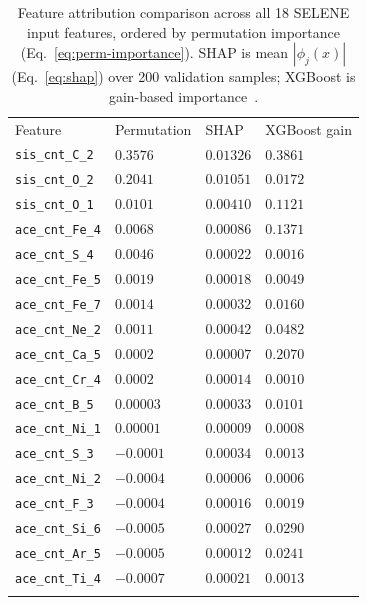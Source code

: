\documentclass[graybox]{SNmult}
\begin{document}
\begin{table}[t]
  \footnotesize
  \caption{Feature attribution comparison across all 18 SELENE input features,
  ordered by permutation importance (Eq.~\ref{eq:perm-importance}). SHAP is
  mean $|\phi_j(x)|$ (Eq.~\ref{eq:shap}) over 200 validation samples; XGBoost
  is gain-based importance~\cite{chen2016xgboost}.}
  \label{tab:attribution}
  \begin{tabular}{p{2.6cm}p{1.8cm}p{1.6cm}p{2cm}}
    \hline\noalign{\smallskip}
    Feature & Permutation & SHAP & XGBoost gain \\
    \noalign{\smallskip}\svhline\noalign{\smallskip}
    \texttt{sis\_cnt\_C\_2}  & $0.3576$  & $0.01326$ & $0.3861$ \\
    \texttt{sis\_cnt\_O\_2}  & $0.2041$  & $0.01051$ & $0.0172$ \\
    \texttt{sis\_cnt\_O\_1}  & $0.0101$  & $0.00410$ & $0.1121$ \\
    \texttt{ace\_cnt\_Fe\_4} & $0.0068$  & $0.00086$ & $0.1371$ \\
    \texttt{ace\_cnt\_S\_4}  & $0.0046$  & $0.00022$ & $0.0016$ \\
    \texttt{ace\_cnt\_Fe\_5} & $0.0019$  & $0.00018$ & $0.0049$ \\
    \texttt{ace\_cnt\_Fe\_7} & $0.0014$  & $0.00032$ & $0.0160$ \\
    \texttt{ace\_cnt\_Ne\_2} & $0.0011$  & $0.00042$ & $0.0482$ \\
    \texttt{ace\_cnt\_Ca\_5} & $0.0002$  & $0.00007$ & $0.2070$ \\
    \texttt{ace\_cnt\_Cr\_4} & $0.0002$  & $0.00014$ & $0.0010$ \\
    \texttt{ace\_cnt\_B\_5}  & $0.00003$ & $0.00033$ & $0.0101$ \\
    \texttt{ace\_cnt\_Ni\_1} & $0.00001$ & $0.00009$ & $0.0008$ \\
    \texttt{ace\_cnt\_S\_3}  & $-0.0001$ & $0.00034$ & $0.0013$ \\
    \texttt{ace\_cnt\_Ni\_2} & $-0.0004$ & $0.00006$ & $0.0006$ \\
    \texttt{ace\_cnt\_F\_3}  & $-0.0004$ & $0.00016$ & $0.0019$ \\
    \texttt{ace\_cnt\_Si\_6} & $-0.0005$ & $0.00027$ & $0.0290$ \\
    \texttt{ace\_cnt\_Ar\_5} & $-0.0005$ & $0.00012$ & $0.0241$ \\
    \texttt{ace\_cnt\_Ti\_4} & $-0.0007$ & $0.00021$ & $0.0013$ \\
    \noalign{\smallskip}\hline
  \end{tabular}
\end{table}
\end{document}
